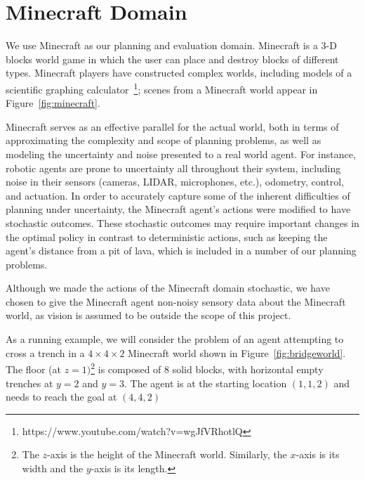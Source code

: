 \documentclass[]{article}
\begin{document}
\section{Minecraft Domain}
We use Minecraft as our planning and evaluation domain. Minecraft is a
3-D blocks world game in which the user can place and destroy blocks
of different types.  Minecraft players have constructed complex
worlds, including models of a scientific graphing
calculator~\footnote{https://www.youtube.com/watch?v=wgJfVRhotlQ};
scenes from a Minecraft world appear in Figure~\ref{fig:minecraft}.  

Minecraft serves as an effective parallel for the actual world, both
in terms of approximating the complexity and scope of planning
problems, as well as modeling the uncertainty and noise presented to
a real world agent.  For instance, robotic agents are
prone to uncertainty all throughout their system, including noise in
their sensors (cameras, LIDAR, microphones, etc.), odometry, control,
and actuation.  In order to accurately capture some of the inherent
difficulties of planning under uncertainty, the Minecraft agent's actions
were modified to have stochastic outcomes. These stochastic outcomes
may require important changes in the optimal policy in contrast
to deterministic actions, such as keeping
the agent's distance from a pit of lava, which is included in a number
of our planning problems.


 Although we made the actions of the Minecraft domain stochastic, we have chosen to give the Minecraft agent non-noisy sensory
data about the Minecraft world, as vision is assumed to be outside the scope of this
project.


As a running example, we will consider the problem of an agent attempting
to cross a trench in a $4 \times 4 \times 2$ Minecraft world shown in
Figure~\ref{fig:bridgeworld}. The floor (at $z = 1)$\footnote{The
  $z$-axis is the height of the Minecraft world. Similarly, the
  $x$-axis is its width and the $y$-axis is its length.} is composed
of 8 solid blocks, with horizontal empty trenches at $y = 2$ and $y =
3$. The agent is at the starting location $(1, 1, 2)$ and needs to
reach the goal at $(4,4,2)$
\end{document}
